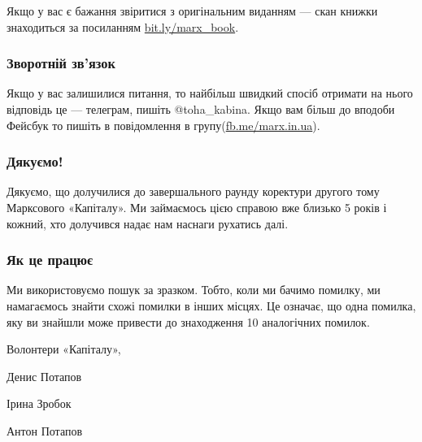 \documentclass{kapital}
\begin{document}
{  \noindent{}Якщо у вас є бажання звіритися з оригінальним виданням — 
  скан книжки знаходиться за посиланням \underline{bit.ly/marx\_book}.

  \subsubsection*{Зворотній зв'язок}


  Якщо у вас залишилися питання, то найбільш швидкий спосіб отримати 
  на нього відповідь це — телеграм, пишіть @toha\_kabina. Якщо вам 
  більш до вподоби Фейсбук то пишіть в повідомлення в 
  групу(\underline{fb.me/marx.in.ua}).

  \subsubsection*{Дякуємо!}

  Дякуємо, що долучилися до завершального раунду коректури другого 
  тому Марксового «Капіталу». Ми займаємось цією справою вже близько 
  5 років і кожний, хто долучився надає нам наснаги рухатись далі.

  \subsubsection*{Як це працює}
  
  Ми використовуємо пошук за зразком. Тобто, коли ми бачимо помилку,
  ми намагаємось знайти схожі помилки в інших місцях. Це означає, 
  що одна помилка, яку ви знайшли може привести до знаходження 
  10 аналогічних помилок. 
  
  \bigskip{}

  \noindent{}Волонтери «Капіталу»,

  \medskip{}

  \noindent{}Денис Потапов

  \noindent{}Ірина Зробок

  \noindent{}Антон Потапов
}
\end{document}
